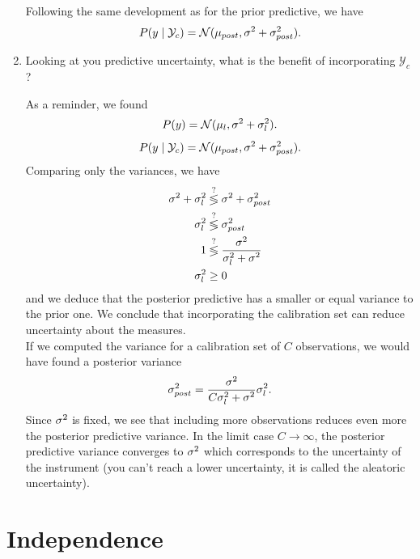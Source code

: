 \documentclass[11pt, a4paper]{article}
\begin{document}
\begin{enumerate}
\begin{solution}
    Following the same development as for the prior predictive, we have 
    $$P(y\mid \mathcal{Y}_c) = \mathcal{N}(\mu_{post}, \text{$\sigma^2$} + \sigma_{post}^2).$$
    \end{solution}
    \item Looking at you predictive uncertainty, what is the benefit of incorporating $\mathcal{Y}_c$?
    
    \begin{solution}
        As a reminder, we found
        $$P(y) = \mathcal{N}(\mu_l, \text{$\sigma^2$} + \sigma_l^2).$$
        $$P(y\mid \mathcal{Y}_c) = \mathcal{N}(\mu_{post}, \text{$\sigma^2$} + \sigma_{post}^2).$$
        Comparing only the variances, we have
        \begin{align*}
            \text{$\sigma^2$} + \sigma_l^2 &\overset{?}{\lessgtr} \text{$\sigma^2$} + \sigma_{post}^2\\
            \sigma_l^2 &\overset{?}{\lessgtr} \sigma_{post}^2\\
            1 &\overset{?}{\lessgtr} \dfrac{\text{$\sigma^2$}}{\sigma_l^2 + \text{$\sigma^2$}}\\
            \sigma_l^2 &\geq 0
        \end{align*}
        and we deduce that the posterior predictive has a smaller or equal variance to the prior one. We conclude that incorporating the calibration set can reduce uncertainty about the measures.\\

        If we computed the variance for a calibration set of $C$ observations, we would have found a posterior variance
        $$\sigma_{post}^2 = \dfrac{\text{$\sigma^2$}}{C\sigma_l^2 + \text{$\sigma^2$}} \sigma_l^2.$$
        Since $\text{$\sigma^2$}$ is fixed, we see that including more observations reduces even more the posterior predictive variance. In the limit case $C\to \infty$, the posterior predictive variance converges to $\text{$\sigma^2$}$ which corresponds to the uncertainty
        of the instrument (you can't reach a lower uncertainty, it is called the aleatoric uncertainty). 
        
    \end{solution}
\end{enumerate}

\newpage

\section{Independence}

\begin{figure}[h]
    \centering
\end{figure}
\end{document}
